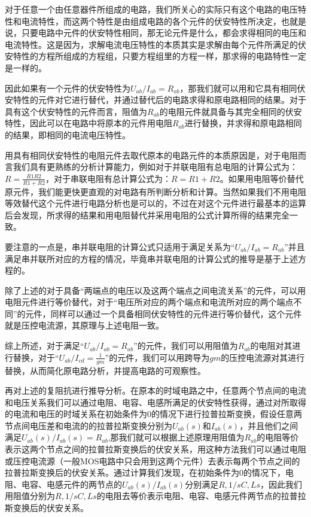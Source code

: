 \documentclass{article}
\numberwithin{equation}{section}
\numberwithin{figure}{section}
\begin{document}
对于任意一个由任意器件所组成的电路，我们所关心的实际只有这个电路的电压特性和电流特性，而这两个特性是由组成电路的各个元件的伏安特性所决定，也就是说，只要电路中元件的伏安特性相同，那无论元件是什么，都会求得相同的电压和电流特性。这是因为，求解电流电压特性的本质其实是求解由每个元件所满足的伏安特性的方程所组成的方程组，只要方程组里的方程一样，那求得的电路特性一定是一样的。

因此如果有一个元件的伏安特性为$U_{ab}/I_{ab}=R_{ab}$，那我们就可以用和它具有相同伏安特性的元件对它进行替代，并通过替代后的电路求得和原电路相同的结果。对于具有这个伏安特性的元件而言，阻值为$R_{ab}$的电阻元件就具备与其完全相同的伏安特性，因此可以在电路中将原本的元件用电阻$R_{ab}$进行替换，并求得和原电路相同的结果，即相同的电流电压特性。

用具有相同伏安特性的电阻元件去取代原本的电路元件的本质原因是，对于电阻而言我们具有更熟练的分析计算能力，例如对于并联电阻有总电阻的计算公式为：$R=\frac{R1R2}{R1+R2}$，对于串联电阻有总计算公式为：$R=R1+R2$。如果用电阻等价替代原元件，我们能更快更直观的对电路有所判断分析和计算。当然如果我们不用电阻等效替代这个元件进行电路分析也是可以的，不过在对这个元件进行最基本的运算后会发现，所求得的结果和用电阻替代并采用电阻的公式计算所得的结果完全一致。

要注意的一点是，串并联电阻的计算公式只适用于满足关系为“$U_{ab}/I_{ab}=R_{ab}$”并且满足串并联所对应的方程的情况，毕竟串并联电阻的计算公式的推导是基于上述方程的。

除了上述的对于具备“两端点的电压以及这两个端点之间电流关系”的元件，可以用电阻元件进行等价替代，对于“电压所对应的两个端点和电流所对应的两个端点不同”的元件，同样可以通过一个具备相同伏安特性的元件进行等价替代，这个元件就是压控电流源，其原理与上述电阻一致。

综上所述，对于满足“$U_{ab}/I_{ab}=R_{ab}$”的元件，我们可以用阻值为$R_{ab}$的电阻对其进行替换，对于“$U_{ab}/I_{cd}=\frac{1}{gm}$”的元件，我们可以用跨导为$gm$的压控电流源对其进行替换，从而简化原电路分析，并提高电路的可观察性。

再对上述的复阻抗进行推导分析。在原本的时域电路之中，任意两个节点间的电流和电压关系我们可以通过电阻、电容、电感所满足的伏安特性获得，通过对所取得的电流和电压的时域关系在初始条件为0的情况下进行拉普拉斯变换，假设任意两节点间电压差和电流的的拉普拉斯变换分别为$U_{ab}(s)$和$I_{ab}(s)$，并且他们之间满足$U_{ab}(s)/I_{ab}(s)=R_{ab}$,那我们就可以根据上述原理用阻值为$R_{ab}$的电阻等价表示这两个节点之间的拉普拉斯变换后的伏安关系，用这种方法我们可以通过电阻或压控电流源（一般MOS电路中只会用到这两个元件）去表示每两个节点之间的拉普拉斯变换后的伏安关系。通过计算我们发现，在初始条件为0的情况下，电阻、电容、电感元件的两节点的$U_{ab}(s)/I_{ab}(s)$分别满足$R,1/sC,Ls$，因此我们用阻值分别为$R,1/sC,Ls$的电阻去等价表示电阻、电容、电感元件两节点的拉普拉斯变换后的伏安关系。
\end{document}
